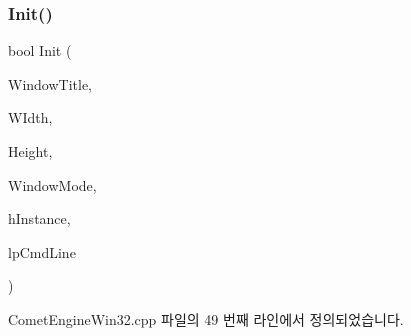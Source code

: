 \subsubsection{\texorpdfstring{Init()}{Init()}}
{\footnotesize\ttfamily bool Init (\begin{DoxyParamCaption}\item[{wchar\+\_\+t $\ast$}]{Window\+Title,  }\item[{int}]{W\+Idth,  }\item[{int}]{Height,  }\item[{\hyperlink{namespace_comet_engine_abdc5ec13bf1dfb1d26eb0bcc9da0ddad}{W\+I\+N\+D\+O\+W\+\_\+\+M\+O\+DE}}]{Window\+Mode,  }\item[{H\+I\+N\+S\+T\+A\+N\+CE}]{h\+Instance,  }\item[{L\+P\+S\+TR}]{lp\+Cmd\+Line }\end{DoxyParamCaption})}



Comet\+Engine\+Win32.\+cpp 파일의 49 번째 라인에서 정의되었습니다.


